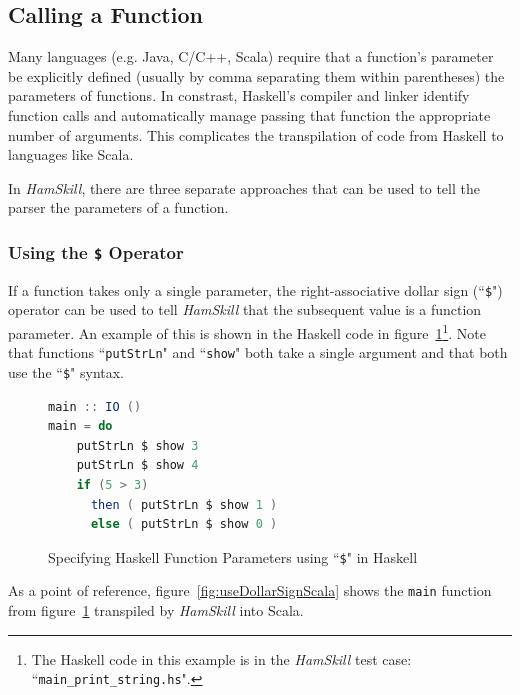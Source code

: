 \documentclass{report}
\begin{document}
\subsection{Calling a Function}\label{sec:callingAFunction}

Many languages (e.g. Java, C/C++, Scala) require that a function's parameter be explicitly defined (usually by comma separating them within parentheses) the parameters of functions.  In constrast, Haskell's compiler and linker identify function calls and automatically manage passing that function the appropriate number of arguments.  This complicates the transpilation of code from Haskell to languages like Scala.

In \textit{HamSkill}, there are three separate approaches that can be used to tell the parser the parameters of a function.

\subsubsection{Using the \texttt{\$} Operator}

If a function takes only a single parameter, the right-associative dollar sign (``\texttt{\$}") operator can be used to tell \textit{HamSkill} that the subsequent value is a function parameter.  An example of this is shown in the Haskell code in figure~\ref{fig:useDollarSignHaskell}\footnote{The Haskell code in this example is in the \textit{HamSkill} test case: ``\texttt{main\_print\_string.hs}".}.  Note that functions ``\texttt{putStrLn}" and ``\texttt{show}" both take a single argument and that both use the ``\texttt{\$}" syntax.

\begin{figure}[H]
\begin{mdframed}
\begin{lstlisting}[basicstyle=\small, language=scala]
main :: IO ()
main = do
    putStrLn $ show 3 
    putStrLn $ show 4
    if (5 > 3) 
      then ( putStrLn $ show 1 ) 
      else ( putStrLn $ show 0 )
\end{lstlisting}
\end{mdframed}
\caption{Specifying Haskell Function Parameters using ``\texttt{\$}" in Haskell}\label{fig:useDollarSignHaskell}
\end{figure}

As a point of reference, figure~\ref{fig:useDollarSignScala} shows the \texttt{main} function from figure~\ref{fig:useDollarSignHaskell} transpiled by \textit{HamSkill} into Scala.
\end{document}

